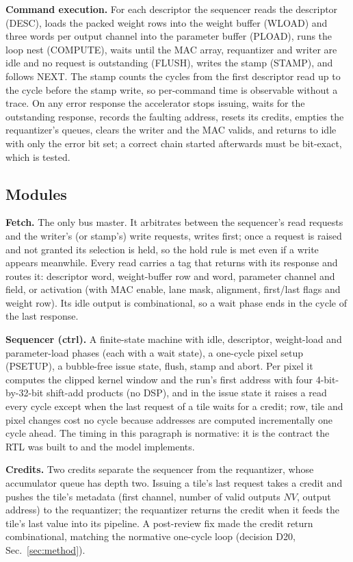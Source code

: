 \documentclass[journal]{IEEEtran}
\begin{document}
\textbf{Command execution.} For each descriptor the sequencer reads the descriptor (DESC), loads the packed weight rows into the weight buffer (WLOAD) and three words per output channel into the parameter buffer (PLOAD), runs the loop nest (COMPUTE), waits until the MAC array, requantizer and writer are idle and no request is outstanding (FLUSH), writes the stamp (STAMP), and follows NEXT. The stamp counts the cycles from the first descriptor read up to the cycle before the stamp write, so per-command time is observable without a trace. On any error response the accelerator stops issuing, waits for the outstanding response, records the faulting address, resets its credits, empties the requantizer's queues, clears the writer and the MAC valids, and returns to idle with only the error bit set; a correct chain started afterwards must be bit-exact, which is tested.

\subsection{Modules}
\textbf{Fetch.} The only bus master. It arbitrates between the sequencer's read requests and the writer's (or stamp's) write requests, writes first; once a request is raised and not granted its selection is held, so the hold rule is met even if a write appears meanwhile. Every read carries a tag that returns with its response and routes it: descriptor word, weight-buffer row and word, parameter channel and field, or activation (with MAC enable, lane mask, alignment, first/last flags and weight row). Its idle output is combinational, so a wait phase ends in the cycle of the last response.

\textbf{Sequencer (ctrl).} A finite-state machine with idle, descriptor, weight-load and parameter-load phases (each with a wait state), a one-cycle pixel setup (PSETUP), a bubble-free issue state, flush, stamp and abort. Per pixel it computes the clipped kernel window and the run's first address with four 4-bit-by-32-bit shift-add products (no DSP), and in the issue state it raises a read every cycle except when the last request of a tile waits for a credit; row, tile and pixel changes cost no cycle because addresses are computed incrementally one cycle ahead. The timing in this paragraph is normative: it is the contract the RTL was built to and the model implements.

\textbf{Credits.} Two credits separate the sequencer from the requantizer, whose accumulator queue has depth two. Issuing a tile's last request takes a credit and pushes the tile's metadata (first channel, number of valid outputs $NV$, output address) to the requantizer; the requantizer returns the credit when it feeds the tile's last value into its pipeline. A post-review fix made the credit return combinational, matching the normative one-cycle loop (decision D20, Sec.~\ref{sec:method}).
\end{document}
